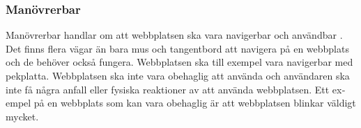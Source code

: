 \documentclass[11p]{article}
\begin{document}
\begin{otherlanguage}{swedish}
    \subsubsection{Manövrerbar}
    Manövrerbar handlar om att webbplatsen ska vara navigerbar och användbar \parencite{WCAG_2.2}.
    Det finns flera vägar än bara mus och tangentbord att navigera på en webbplats och de behöver också fungera.
    Webbplatsen ska till exempel vara navigerbar med pekplatta.
    Webbplatsen ska inte vara obehaglig att använda och användaren ska inte få några anfall eller fysiska reaktioner av att använda webbplatsen.%
    Ett exempel på en webbplats som kan vara obehaglig är att webbplatsen blinkar väldigt mycket.


\end{otherlanguage}
\end{document}
